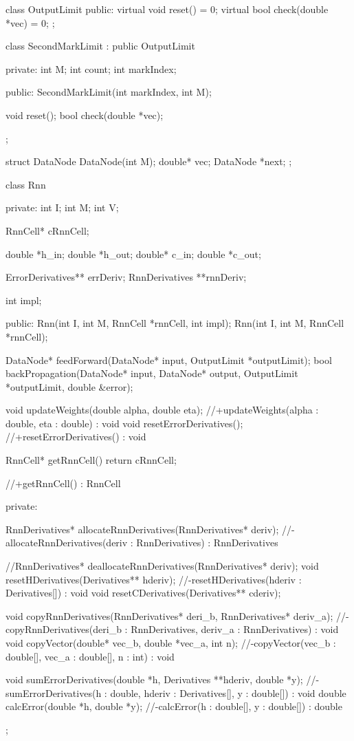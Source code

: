 class OutputLimit {
  public:
    virtual void reset() = 0;
    virtual bool check(double *vec) = 0;
};

class SecondMarkLimit : public OutputLimit {
  private:
    int M;
    int count;
    int markIndex;

  public:
    SecondMarkLimit(int markIndex, int M);

    void reset();
    bool check(double *vec);
};

struct DataNode{
  DataNode(int M);
  double* vec;
  DataNode *next;
};


class Rnn {
  private:
    int I;
    int M;
    int V;

    RnnCell* cRnnCell;


    double *h\_in;
    double *h\_out;
    double* c\_in;
    double *c\_out;

    ErrorDerivatives** errDeriv;
    RnnDerivatives **rnnDeriv;

    int impl;

  public:
    Rnn(int I, int M, RnnCell *rnnCell, int impl);
    Rnn(int I, int M, RnnCell *rnnCell);

    DataNode* feedForward(DataNode* input, OutputLimit *outputLimit);
    bool backPropagation(DataNode* input, DataNode* output, OutputLimit *outputLimit, double \&error);

    void updateWeights(double alpha, double eta);
    //+updateWeights(alpha : double, eta : double) : void
    void resetErrorDerivatives();
    //+resetErrorDerivatives() : void


    RnnCell* getRnnCell(){
      return cRnnCell;
    }

    //+getRnnCell() : RnnCell

  private:

    RnnDerivatives* allocateRnnDerivatives(RnnDerivatives* deriv);
    //-allocateRnnDerivatives(deriv : RnnDerivatives) : RnnDerivatives

    //RnnDerivatives* deallocateRnnDerivatives(RnnDerivatives* deriv);
    void resetHDerivatives(Derivatives** hderiv);
    //-resetHDerivatives(hderiv : Derivatives[]) : void
    void resetCDerivatives(Derivatives** cderiv);


    void copyRnnDerivatives(RnnDerivatives* deri\_b, RnnDerivatives* deriv\_a);
    //-copyRnnDerivatives(deri\_b : RnnDerivatives, deriv\_a : RnnDerivatives) : void
    void copyVector(double* vec\_b, double *vec\_a, int n);
    //-copyVector(vec\_b : double[], vec\_a : double[], n : int) : void

    void sumErrorDerivatives(double *h, Derivatives **hderiv, double *y);
    //-sumErrorDerivatives(h : double, hderiv : Derivatives[], y : double[]) : void
    double calcError(double *h, double *y);
    //-calcError(h : double[], y : double[]) : double


};

